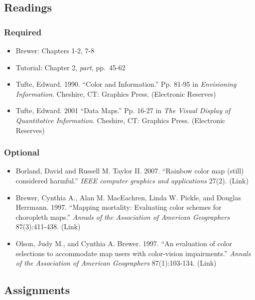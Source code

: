 \documentclass[]{book}
\providecommand{\tightlist}{%
  \setlength{\itemsep}{0pt}\setlength{\parskip}{0pt}}
\begin{document}
\hypertarget{readings-4}{%
\subsection*{Readings}\label{readings-4}}

\hypertarget{required-3}{%
\subsubsection*{Required}\label{required-3}}

\begin{itemize}
\item
  Brewer: Chapters 1-2, 7-8
\item
  Tutorial: Chapter 2, \emph{part}, pp.~45-62
\item
  Tufte, Edward. 1990. ``Color and Information.'' Pp. 81-95 in \emph{Envisioning Information}. Cheshire, CT: Graphics Press. (Electronic Reserves)
\item
  Tufte, Edward. 2001 ``Data Maps.'' Pp. 16-27 in \emph{The Visual Display of Quantitative Information}. Cheshire, CT: Graphics Press. (Electronic Reserves)
\end{itemize}

\hypertarget{optional-2}{%
\subsubsection*{Optional}\label{optional-2}}

\begin{itemize}
\tightlist
\item
  Borland, David and Russell M. Taylor II. 2007. ``Rainbow color map (still) considered harmful.'' \emph{IEEE computer graphics and applications} 27(2). (Link)
\item
  Brewer, Cynthia A., Alan M. MacEachren, Linda W. Pickle, and Douglas Herrmann. 1997. ``Mapping mortality: Evaluating color schemes for choropleth maps.'' \emph{Annals of the Association of American Geographers} 87(3):411-438. (Link)
\item
  Olson, Judy M., and Cynthia A. Brewer. 1997. ``An evaluation of color selections to accommodate map users with color‐vision impairments.'' \emph{Annals of the Association of American Geographers} 87(1):103-134. (Link)
\end{itemize}

\hypertarget{assignments-4}{%
\subsection*{Assignments}\label{assignments-4}}
\end{document}
